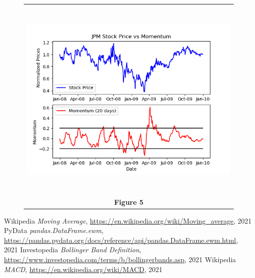 \documentclass[
	letterpaper, %
]{jdf}
\begin{document}
\begin{figure}[h]
	\begin{tabular}{c}
		\includegraphics[height=10cm]{JPM_mom.png} \\
		\textbf{Figure 5} \\ 
	\end{tabular}
\end{figure}

\makeatletter
\renewcommand\@biblabel[1]{\textbullet}
\makeatother

\begin{thebibliography}{shortest-entry}

 Wikipedia \textit{Moving Average}, \url{https://en.wikipedia.org/wiki/Moving\_average}, 2021
 PyData \textit{pandas.DataFrame.ewm}, \url{https://pandas.pydata.org/docs/reference/api/pandas.DataFrame.ewm.html}, 2021
 Investopedia \textit{Bollinger Band Definition}, \url{https://www.investopedia.com/terms/b/bollingerbands.asp}, 2021
 Wikipedia \textit{MACD}, \url{https://en.wikipedia.org/wiki/MACD}, 2021

\end{thebibliography}
\end{document}
